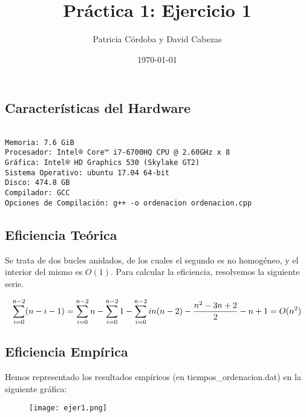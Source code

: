 \documentclass{article}
\begin{document}
\title{Práctica 1: Ejercicio 1}
\author{Patricia Córdoba y David Cabezas}
\date{\today}
\maketitle

\subsection*{Características del Hardware}
\begin{verbatim}

Memoria: 7.6 GiB
Procesador: Intel® Core™ i7-6700HQ CPU @ 2.60GHz x 8
Gráfica: Intel® HD Graphics 530 (Skylake GT2)
Sistema Operativo: ubuntu 17.04 64-bit
Disco: 474.8 GB
Compilador: GCC
Opciones de Compilación: g++ -o ordenacion ordenacion.cpp

\end{verbatim}

\subsection*{Eficiencia Teórica}

\begin{justify}
  Se trata de dos bucles anidados, de los cuales el segundo es no
  homogéneo, y el interior del mismo es $O(1)$. Para calcular la
  eficiencia, resolvemos la siguiente serie.
\end{justify}

\[
  \sum\limits_{i=0}^{n-2}(n-i-1) = \sum\limits_{i=0}^{n-2}n - \sum\limits_{i=0}^{n-2} 1 - \sum\limits_{i=0}^{n-2} i \\
  n(n-2) - \frac{n^2-3n+2}{2} - n + 1 = O(n^2)
\]

\subsection*{Eficiencia Empírica}

\begin{justify}
  Hemos representado los resultados empíricos (en tiempos\_ordenacion.dat) en la siguiente gráfica:
\end{justify}

\begin{figure}[H]
  \centering
  \texttt{[image: ejer1.png]}
\end{figure}
\end{document}
